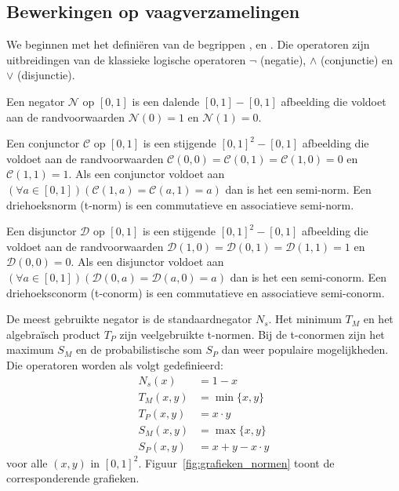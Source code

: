 \subsection{Bewerkingen op vaagverzamelingen}
\label{sectie:bew_op_vaagverz}

We beginnen met het defini\"eren van de begrippen ,  en 
. Die operatoren zijn uitbreidingen van de klassieke logische operatoren
$\lnot$ (negatie), $\land$ (conjunctie) en $\lor$ (disjunctie).
\begin{definitie}
Een negator $\mathcal{N}$ op $[0,1]$ is een dalende $[0,1] - [0,1]$ afbeelding die voldoet
aan de randvoorwaarden $\mathcal{N}(0)=1$ en $\mathcal{N}(1)=0$. 
\end{definitie}
\begin{definitie}
Een conjunctor $\mathcal{C}$ op $[0,1]$ is een stijgende $[0,1]^2 - [0,1]$ afbeelding die voldoet aan de
randvoorwaarden $\mathcal{C}(0,0)=\mathcal{C}(0,1)=\mathcal{C}(1,0)=0$ en $\mathcal{C}(1,1)=1$. 
Als een conjunctor voldoet aan 
$(\forall a \in [0,1])(\mathcal{C}(1,a)=\mathcal{C}(a,1)=a)$ dan is het een semi-norm.
Een driehoeksnorm (t-norm) is een commutatieve en associatieve semi-norm.
\end{definitie}
\begin{definitie}
Een disjunctor $\mathcal{D}$ op $[0,1]$ is een stijgende $[0,1]^2 - [0,1]$ afbeelding die voldoet
aan de randvoorwaarden $\mathcal{D}(1,0)=\mathcal{D}(0,1)=\mathcal{D}(1,1)=1$ en 
$\mathcal{D}(0,0)=0$. Als een disjunctor voldoet aan 
$(\forall a \in [0,1])(\mathcal{D}(0,a)=\mathcal{D}(a,0)=a)$ dan is het een semi-conorm.
Een driehoeksconorm (t-conorm) is een commutatieve en associatieve semi-conorm.
\end{definitie}
\noindent
De meest gebruikte negator is de standaardnegator $N_s$. Het minimum $T_M$ en het algebra\"isch 
product $T_P$ zijn veelgebruikte t-normen. Bij de t-conormen zijn het maximum $S_M$ en de
probabilistische som $S_P$ dan weer populaire mogelijkheden. Die operatoren worden als 
volgt gedefinieerd:
\begin{align*}
N_s(x) &= 1 - x \\
T_M(x,y) &= \min \{x,y\} \\
T_P(x,y) &= x \cdot y \\
S_M(x,y) &= \max \{x,y\} \\
S_P(x,y) &= x + y - x \cdot y
\end{align*}
voor alle $(x,y)$ in $[0,1]^2$. Figuur~\ref{fig:grafieken_normen} toont de corresponderende
grafieken.

